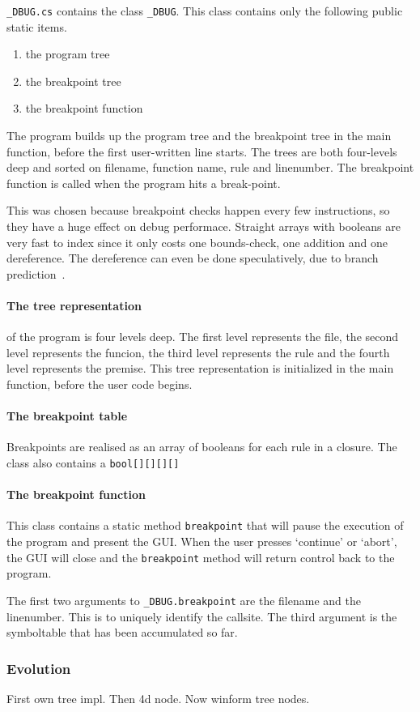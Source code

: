 \verb|_DBUG.cs| contains the class \verb|_DBUG|.
This class contains only the following public static items.

\begin{enumerate}
    \item the program tree
    \item the breakpoint tree
    \item the breakpoint function
\end{enumerate}

The program builds up the program tree and the breakpoint tree in the main function, before the first user-written line starts.
The trees are both four-levels deep and sorted on filename, function name, rule and linenumber.
The breakpoint function is called when the program hits a break-point.

This was chosen because breakpoint checks happen every few instructions, so they have a huge effect on debug performace.
Straight arrays with booleans are very fast to index since it only costs one bounds-check, one addition and one dereference.
The dereference can even be done speculatively, due to branch prediction~\cite{branchprediction}.

\paragraph{The tree representation} of the program is four levels deep.
The first level represents the file, the second level represents the funcion, the third level represents the rule and the fourth level represents the premise.
This tree representation is initialized in the main function, before the user code begins.

\paragraph{The breakpoint table} 
Breakpoints are realised as an array of booleans for each rule in a closure.
The class also contains a \verb|bool[][][][]| 

\paragraph{The breakpoint function}
This class contains a static method \verb|breakpoint| that will pause the execution of the program and present the GUI.
When the user presses `continue' or `abort', the GUI will close and the \verb|breakpoint| method will return control back to the program.

The first two arguments to \verb|_DBUG.breakpoint| are the filename and the linenumber.
This is to uniquely identify the callsite.
The third argument is the symboltable that has been accumulated so far.


\subsubsection{Evolution}
First own tree impl.
Then 4d node.
Now winform tree nodes.


